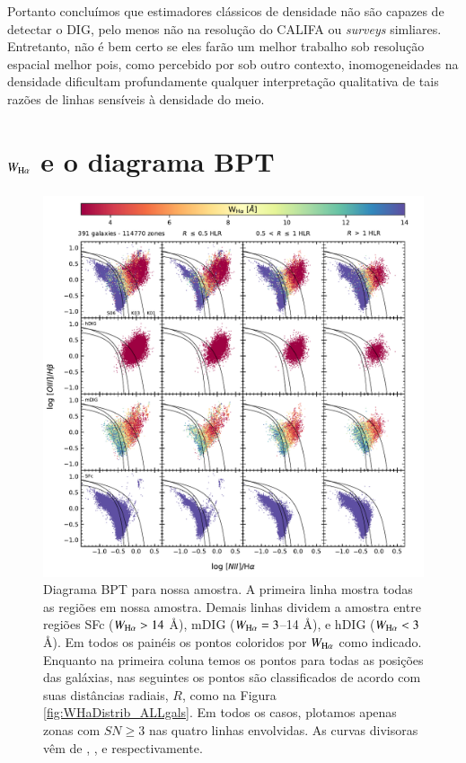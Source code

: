 Portanto concluímos que estimadores clássicos de densidade não são capazes de detectar o DIG, pelo menos não na resolução do CALIFA ou {\em surveys} simliares. Entretanto, não é bem certo se eles farão um melhor trabalho sob resolução espacial melhor pois, como percebido por \citet{Rubin.1989} sob outro contexto, inomogeneidades na densidade dificultam profundamente qualquer interpretação qualitativa de tais razões de linhas sensíveis à densidade do meio.


\section{$W_{{\rm H}\alpha}$ e o diagrama BPT}
\label{sec:DIGdisc:BPT}

\begin{figure}
 \includegraphics[scale=0.85]{figuras/fig_BPT_per_R.pdf}
 \caption[Diagramas BPT]
 {Diagrama BPT para nossa amostra. A primeira linha mostra todas as regiões em nossa amostra. Demais linhas dividem a amostra entre regiões SFc ($W_{\Ha} > 14$ \AA), mDIG ($W_{\Ha} = 3$--14 \AA), e hDIG ($W_{\Ha} < 3$ \AA). Em todos os painéis os pontos coloridos por $W_{\Ha}$ como indicado. Enquanto na primeira coluna temos os pontos para todas as posições das galáxias, nas seguintes os pontos são classificados de acordo com suas distâncias radiais, $R$, como na Figura \ref{fig:WHaDistrib_ALLgals}. Em todos os casos, plotamos apenas zonas com $SN \ge 3$ nas quatro linhas envolvidas. As curvas divisoras vêm de \citet[S06]{Stasinska.etal.2006a}, \citet[K03]{Kauffmann.etal.2003a}, e \citet[K01]{Kewley.etal.2001a} respectivamente.}
 \label{fig:BPT}
\end{figure}

